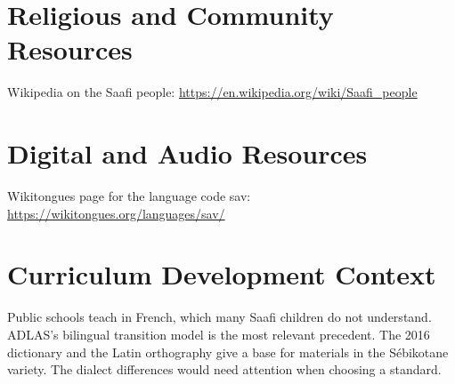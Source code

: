 \documentclass[12pt]{article}
\begin{document}
\section{Religious and Community Resources}
Wikipedia on the Saafi people: \url{https://en.wikipedia.org/wiki/Saafi_people}

\section{Digital and Audio Resources}
Wikitongues page for the language code sav: \url{https://wikitongues.org/languages/sav/}

\section{Curriculum Development Context}
Public schools teach in French, which many Saafi children do not understand. ADLAS's bilingual transition model is the most relevant precedent. The 2016 dictionary and the Latin orthography give a base for materials in the S\'ebikotane variety. The dialect differences would need attention when choosing a standard.
\end{document}
